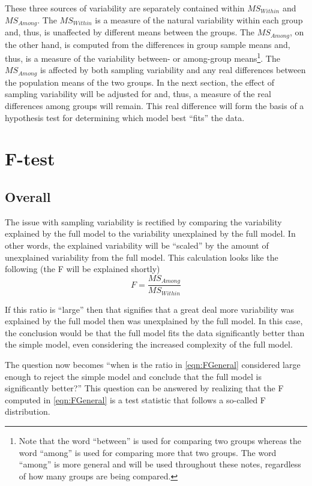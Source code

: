 \documentclass[10pt,openany]{book}\usepackage[]{graphicx}\usepackage[]{color}
\begin{document}
These three sources of variability are separately contained within $MS_{Within}$ and $MS_{Among}$.  The $MS_{Within}$ is a measure of the natural variability within each group and, thus, is unaffected by different means between the groups.  The $MS_{Among}$, on the other hand, is computed from the differences in group sample means and, thus, is a measure of the variability between- or among-group means\footnote{Note that the word ``between'' is used for comparing two groups whereas the word ``among'' is used for comparing more that two groups.  The word ``among'' is more general and will be used throughout these notes, regardless of how many groups are being compared.}.  The $MS_{Among}$ is affected by both sampling variability and any real differences between the population means of the two groups.  In the next section, the effect of sampling variability will be adjusted for and, thus, a measure of the real differences among groups will remain.  This real difference will form the basis of a hypothesis test for determining which model best ``fits'' the data.


\section{F-test}\label{sec:Ftest}
\subsection{Overall}
The issue with sampling variability is rectified by comparing the variability explained by the full model to the variability unexplained by the full model.  In other words, the explained variability will be ``scaled'' by the amount of unexplained variability from the full model.  This calculation looks like the following (the F will be explained shortly)
\begin{equation}\label{eqn:FGeneral}
  F = \frac{MS_{Among}}{MS_{Within}}
\end{equation}

If this ratio is ``large'' then that signifies that a great deal more variability was explained by the full model then was unexplained by the full model.  In this case, the conclusion would be that the full model fits the data significantly better than the simple model, even considering the increased complexity of the full model.

The question now becomes ``when is the ratio in \eqref{eqn:FGeneral} considered large enough to reject the simple model and conclude that the full model is significantly better?''  This question can be answered by realizing that the F computed in \eqref{eqn:FGeneral} is a test statistic that follows a so-called F distribution.
\end{document}
